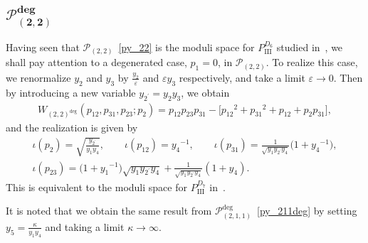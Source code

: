 \documentclass[pdftex]{sigma}
\numberwithin{equation}{section}
\begin{document}
\subsection[$\mathcal{P}_{(2,2)}^{\text{deg}}$]{$\boldsymbol{\mathcal{P}_{(2,2)}^{\text{deg}}}$}
Having seen that $\mathcal{P}_{(2,2)}$~\eqref{py_22} is the moduli space for $P_{\mathrm{III}}^{D_6}$ studied in~\cite{vdPutSaito09a}, we shall pay attention to a degenerated case, $p_1=0$, in $\mathcal{P}_{(2,2)}$. To realize this case, we renormalize $y_2$ and $y_3$ by $\frac{y_2}{\varepsilon}$ and $\varepsilon y_3$ respectively, and take a limit $\varepsilon\to 0$. Then by introducing a new variable $y_{2^\prime} = y_2 y_3$, we obtain
\begin{gather*}
 W_{(2,2)^{\text{deg}}}(p_{12}, p_{31}, p_{23}; p_2) = p_{12} p_{23} p_{31} - \big[ {p_{12}}^2 + {p_{31}}^2 + p_{12} + p_2 p_{31} \big] ,
\end{gather*}
and the realization is given by
\begin{gather}
 \iota(p_2) = \sqrt{\frac{y_{2^\prime}}{y_1 y_4}} ,\qquad \iota(p_{12}) = {y_4}^{-1}, \qquad
 \iota(p_{31}) = \frac{1}{\sqrt{y_1 y_{2^\prime} y_4}} \big(1+{y_4}^{-1}\big),\nonumber \\
 \iota(p_{23}) = \big( 1 + {y_1}^{-1} \big) \sqrt{y_1 y_{2^\prime} y_4} + \frac{1}{\sqrt{y_1 y_{2^\prime} y_4} }(1+y_4) . \label{py_22deg}
\end{gather}
This is equivalent to the moduli space for $P_{\mathrm{III}}^{D_7}$ in~\cite{vdPutSaito09a}.

It is noted that we obtain the same result from $\mathcal{P}_{(2,1,1)}^{\text{deg}}$~\eqref{py_211deg} by setting $y_5=\frac{\kappa}{y_1 y_4}$ and taking a limit $\kappa\to\infty$.
\end{document}
